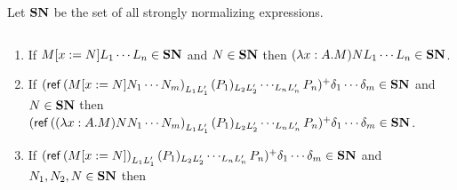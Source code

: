 
Let $\mathbf{SN}$ be the set of all strongly normalizing expressions.

\begin{lemma}
\label{lm:SN}
$ $
\begin{enumerate}
\item
\label{lm:SN1}
If $M[x:=N]L_1 \cdots L_n \in \mathbf{SN}$ and $N \in \mathbf{SN}$ then $(\lambda x:A.M)NL_1 \cdots L_n \in \mathbf{SN}$.
\item
\label{lm:SN2}
If $(\mathsf{ref} \left( {M[x:=N]N_1 \cdots N_m} \right)_{L_1 L_1'} (P_1)_{L_2 L_2'} \cdots_{L_n L_n'} P_n)^+ \delta_1 \cdots \delta_m \in \mathbf{SN}$ and $N \in \mathbf{SN}$ then
$(\mathsf{ref} \left( {(\lambda x:A.M)NN_1 \cdots N_m} \right)_{L_1 L_1'} (P_1)_{L_2 L_2'} \cdots_{L_n L_n'} P_n)^+ \delta_1 \cdots \delta_m \in \mathbf{SN}$.
\item
\label{lm:SN4}
If $(\mathsf{ref} \left( {M[x:=N]} \right)_{L_1 L_1'} (P_1)_{L_2 L_2'} \cdots_{L_n L_n'} P_n)^+ \delta_1 \cdots \delta_m \in \mathbf{SN}$ and $N_1, N_2, N \in \mathbf{SN}$ then \\

\end{enumerate}
\end{lemma}
